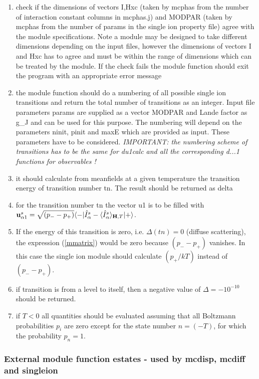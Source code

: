 \begin{enumerate}
\item check if the dimensions of vectors I,Hxc (taken by {\prg mcphas} from the number of 
interaction constant columns in {\prg mcphas.j})
 and MODPAR (taken by {\prg mcphas} from the number of params in the single ion property
file) agree with the module specifications. Note a module may be designed to 
take different dimensions depending on the input files, however the dimensions
of vectors I and Hxc has to agree and must be within the range of dimensions which
can be treated by the module. If the check fails the module function should exit the
program with an appropriate error message
\item the module function should do a numbering of all possible single ion transitions and return
the total number of transitions as an integer. Input file parameters params are supplied as a vector MODPAR and
Lande factor as g\_J and  can be used for this purpose. The numbering will depend on
the parameters ninit, pinit and maxE which are provided as input. These parameters
have to be considered. {\em IMPORTANT: the numbering scheme of transitions has to
be the same for du1calc and all the corresponding d...1 functions for observables !}
\item it should calculate from meanfields at a given temperature the 
transition energy of transition number {\prg tn}. The result should be returned as {\prg delta}
\item for the transition number tn the vector u1 is to
 be filled with 
${\mathbf u^s_{\alpha1}}=\sqrt{(p_--p_+)}\langle -|\hat I^s_{\alpha}-\langle \hat I^s_{\alpha}\rangle_{\mathbf H,T}|+\rangle$.
\item
If the energy of this transition
is zero, i.e. $\Delta(tn)=0$ (diffuse scattering), 
the expression (\ref{mmatrix}) would be zero because $(p_--p_+)$ vanishes.
In this case the single ion module should calculate $(p_+/kT)$ instead of $(p_--p_+)$.
\item if transition is from a level to itself, then a negative 
value of $\Delta=-10^{-10}$ should be returned.
\item if $T<0$ all quantities should be evaluated assuming that all Boltzmann probabilities $p_i$
 are zero except for the state number $n=(-T)$, for which the probability $p_n=1$.
\end{enumerate}

\subsubsection{External module function {\prg estates} - used by {\prg mcdisp},
 {\prg %
mcdiff} and {\prg singleion}}

